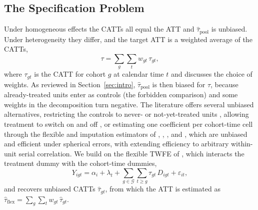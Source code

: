 \documentclass[margin=5in, 12pt]{article}
\newcommand{\1}{\mathbbm{1}}
\begin{document}
\subsection{The Specification Problem}
Under homogeneous effects the CATTs all equal the ATT and $\hat\tau_{\text{pool}}$ is unbiased. Under heterogeneity they differ, and the target ATT is a weighted average of the CATTs,
\begin{equation}
\label{eq:theta}
	\tau = \sum_{g}\sum_{t} w_{gt}\,\tau_{gt},
\end{equation}
where $\tau_{gt}$ is the CATT for cohort $g$ at calendar time $t$ and \citet{callaway2021} discusses the choice of weights. As reviewed in Section~\ref{sec:intro}, $\hat\tau_{\text{pool}}$ is then biased for $\tau$, because already-treated units enter as controls (the forbidden comparison) and some weights in the \citet{goodman2021} decomposition turn negative. The literature offers several unbiased alternatives, restricting the controls to never- or not-yet-treated units \citep{callaway2021, sun2021}, allowing treatment to switch on and off \citep{dechaisemartin2020}, or estimating one coefficient per cohort-time cell through the flexible and imputation estimators of \citet{wooldridge2025}, \citet{gardner2022two}, \citet{borusyak2024}, and \citet{liu2024practical}, which are unbiased and efficient under spherical errors, with \citet{arora2026} extending efficiency to arbitrary within-unit serial correlation. We build on the flexible TWFE of \citet{wooldridge2025}, which interacts the treatment dummy with the cohort-time dummies,
\begin{equation}
  Y_{igt} = \alpha_i + \lambda_t
    + \sum_{g \in \mathcal{G}} \sum_{t \geq g} \tau_{gt}\, D_{igt}
    + \varepsilon_{it},
  \label{eq:twfe_flex}
\end{equation}
and recovers unbiased CATTs $\hat\tau_{gt}$, from which the ATT is estimated as $\hat\tau_{\text{flex}} = \sum_{g}\sum_{t} w_{gt}\,\hat\tau_{gt}$.
\end{document}

